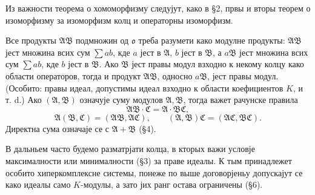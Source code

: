 ﻿\documentclass[11pt]{article}
\providecommand{\mA}{\mathfrak{A}}
\providecommand{\mB}{\mathfrak{B}}
\providecommand{\mC}{\mathfrak{C}}
\providecommand{\mo}{\mathfrak{o}}
\begin{document}
Из важности теорема о хомоморфизму следујут, како в §2, првы и вторы теорем о изоморфизму за изоморфизм колц и операторны изоморфизм.

Все продукты $\mA\mB$ подмножин од $\mo$ треба разумети како модулне продукты: $\mA\mB$ јест множина всих сум $\sum ab$, кде $a$ јест в $\mA$, $b$ јест в $\mB$, а $a\mB$ јест множина всих сум $\sum ab$, кде $b$ јест в $\mB$. Ако $\mB$ јест правы модул взходно к некому колцу како области операторов, тогда и продукт $\mA\mB$, односно $a\mB$, јест правы модул. (Особито: правы идеал, допустимы идеал взходно к области коефициентов $K$, и т. d.) Ако $(\mA,\mB)$ означује суму модулов $\mA,\mB$, тогда важет рачунске правила
\[
        \mA\mB\cdot\mC=\mA\cdot\mB\mC,
\]
\[
        \mA(\mB,\mC)=(\mA\mB,\mA\mC),
        \qquad
        (\mA,\mB)\mC=(\mA\mC,\mB\mC).
\]
Директна сума означаје се с $\mA+\mB$ (§4).

В дальньем часто будемо разматрјати колца, в кторых важи условје максималности или минималности (§3) за праве идеалы. К тым принадлежет особито хиперкомплексне системы, понеже по выше договорјеньу допускајут се како идеалы само $K$-модулы, а зато јих ранг остава ограничены (§6).
\end{document}
